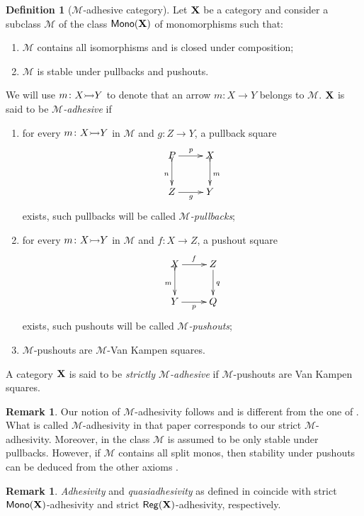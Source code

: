 \documentclass[a4paper]{article}
\newcommand{\mon}{\mathsf{Mono}}
\newcommand{\reg}{\mathsf{Reg}}
\newcommand{\mto}[0]{\scalebox{1}{$\rightarrowtail$}}
\def\X{\textbf {\textup{X}}}
\theoremstyle{definition}
\newtheorem{definition}[theorem]{Definition}
\newtheorem{remark}[theorem]{Remark}
\begin{document}
\begin{definition}[$\mathcal{M}$-adhesive category]
	Let $\X$ be a category and consider a subclass $\mathcal{M}$ of the class $\mon(\X)$ of monomorphisms such that:
	\begin{enumerate}
		\item $\mathcal{M}$ contains all isomorphisms and is closed under composition;
		\item $\mathcal{M}$ is stable under pullbacks and pushouts.
	\end{enumerate} 
	We will use $m\colon X\mto Y$ to denote that an arrow $m:X\to Y$ belongs to $\mathcal{M}$. $\X$ is said to be \emph{$\mathcal{M}$-adhesive} if
	\begin{enumerate}
		\item for every $m\colon X\mto Y$ in $\mathcal{M}$ and $g\colon Z\to Y$, a pullback square
		\[\xymatrix{P\ar[r]^p \ar@{>->}[d]_{n}& X \ar@{>->}[d]^{m}\\ Z \ar[r]_g& Y}\]
		exists, such pullbacks will be called \emph{$\mathcal{M}$-pullbacks};
		\item for every $m\colon X\mto Y$ in $\mathcal{M}$ and $f\colon X\to Z$, a pushout square
		\[\xymatrix{X \ar[r]^f \ar@{>->}[d]_{m}& Z \ar[d]^{q}\\ Y\ar[r]_p &Q}\]
		exists, such pushouts  will be called \emph{$\mathcal{M}$-pushouts}; 
		\item  $\mathcal{M}$-pushouts are $\mathcal{M}$-Van Kampen squares.
	\end{enumerate}
	
A category $\X$ is said to be \emph{strictly $\mathcal{M}$-adhesive} if $\mathcal{M}$-pushouts are Van Kampen squares.	
\end{definition}

\begin{remark}\label{rem:diff}Our notion of $\mathcal{M}$-adhesivity follows \cite{ehrig2012,ehrig2014adhesive} and is different from the one of \cite{azzi2019essence}. What is called $\mathcal{M}$-adhesivity in that paper corresponds to our strict $\mathcal{M}$-adhesivity. Moreover, in \cite{azzi2019essence} the class $\mathcal{M}$ is assumed to be only stable under pullbacks. However, if $\mathcal{M}$ contains all split monos, then stability under pushouts can be deduced from the other axioms \cite[Prop.~$5.1.21$]{castelnovo2023thesis}.
\end{remark}


\begin{remark}\label{rem:salva} 
	\emph{Adhesivity} and \emph{quasiadhesivity} as defined in \cite{lack2005adhesive,garner2012axioms}  coincide with  strict $\mon(\X) $-adhesivity and strict $\reg(\X)$-adhesivity, respectively. 
\end{remark}
\end{document}
